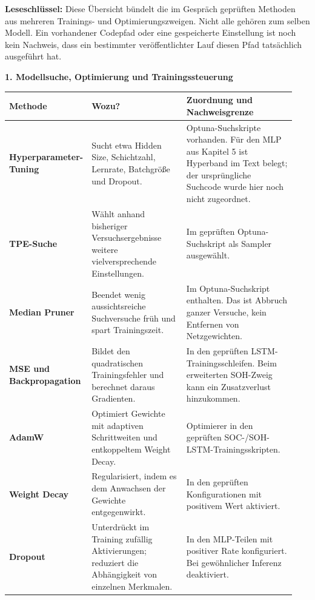 \clearpage
{}
\textbf{Leseschlüssel:} Diese Übersicht bündelt die im Gespräch geprüften Methoden aus mehreren Trainings- und Optimierungszweigen. Nicht alle gehören zum selben Modell. Ein vorhandener Codepfad oder eine gespeicherte Einstellung ist noch kein Nachweis, dass ein bestimmter veröffentlichter Lauf diesen Pfad tatsächlich ausgeführt hat.

\textbf{1. Modellsuche, Optimierung und Trainingssteuerung}
\begingroup\footnotesize\setlength{\tabcolsep}{4pt}\renewcommand{\arraystretch}{1.08}
\begin{longtable}{@{}p{0.20\linewidth}p{0.34\linewidth}p{0.40\linewidth}@{}}\toprule\textbf{Methode} & \textbf{Wozu?} & \textbf{Zuordnung und Nachweisgrenze}\\\midrule\endhead
\textbf{Hyperparameter-Tuning} & Sucht etwa Hidden Size, Schichtzahl, Lernrate, Batchgröße und Dropout. & Optuna-Suchskripte vorhanden. Für den MLP aus Kapitel 5 ist Hyperband im Text belegt; der ursprüngliche Suchcode wurde hier noch nicht zugeordnet.\\[5pt]\midrule
\textbf{TPE-Suche} & Wählt anhand bisheriger Versuchsergebnisse weitere vielversprechende Einstellungen. & Im geprüften Optuna-Suchskript als Sampler ausgewählt.\\[5pt]\midrule
\textbf{Median Pruner} & Beendet wenig aussichtsreiche Suchversuche früh und spart Trainingszeit. & Im Optuna-Suchskript enthalten. Das ist Abbruch ganzer Versuche, kein Entfernen von Netzgewichten.\\[5pt]\midrule
\textbf{MSE und Backpropagation} & Bildet den quadratischen Trainingsfehler und berechnet daraus Gradienten. & In den geprüften LSTM-Trainingsschleifen. Beim erweiterten SOH-Zweig kann ein Zusatzverlust hinzukommen.\\[5pt]\midrule
\textbf{AdamW} & Optimiert Gewichte mit adaptiven Schrittweiten und entkoppeltem Weight Decay. & Optimierer in den geprüften SOC-/SOH-LSTM-Trainingsskripten.\\[5pt]\midrule
\textbf{Weight Decay} & Regularisiert, indem es dem Anwachsen der Gewichte entgegenwirkt. & In den geprüften Konfigurationen mit positivem Wert aktiviert.\\[5pt]\midrule
\textbf{Dropout} & Unterdrückt im Training zufällig Aktivierungen; reduziert die Abhängigkeit von einzelnen Merkmalen. & In den MLP-Teilen mit positiver Rate konfiguriert. Bei gewöhnlicher Inferenz deaktiviert.\\[5pt]\midrule

\end{longtable}
